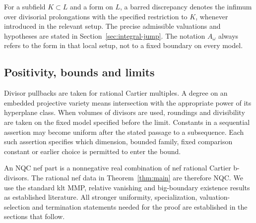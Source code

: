 For a subfield $K\subset L$ and a form on $L$, a barred discrepancy
denotes the infimum over divisorial prolongations with the specified
restriction to $K$, whenever introduced in the relevant setup. The
precise admissible valuations and hypotheses are stated in
Section~\ref{sec:integral-jump}. The notation $A_\omega$ always refers
to the form in that local setup, not to a fixed boundary on every model.

\subsection{Positivity, bounds and limits}

Divisor pullbacks are taken for rational Cartier multiples. A degree
on an embedded projective variety means intersection with the
appropriate power of its hyperplane class. When volumes of divisors
are used, roundings and divisibility are taken on the fixed model
specified before the limit. Constants in a sequential assertion may
become uniform after the stated passage to a subsequence. Each such
assertion specifies which dimension, bounded family, fixed comparison
constant or earlier choice is permitted to enter the bound.

An NQC nef part is a nonnegative real combination of nef rational
Cartier b-divisors. The rational nef data in
Theorem~\ref{thm:main} are therefore NQC. We use the standard klt
MMP, relative vanishing and big-boundary existence results as
established literature. All stronger uniformity, specialization,
valuation-selection and termination statements needed for the proof
are established in the sections that follow.
